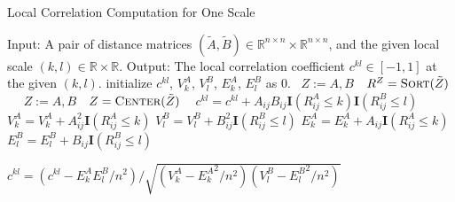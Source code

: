 \documentclass[11pt]{article}
\providecommand{\mb}[1]{\boldsymbol{#1}}
\newcommand{\Real}{\mathbb{R}}
\newcommand{\G}{c}
\newcommand{\Linefor}[2]{%
    \State \algorithmicfor\ {#1}\ \algorithmicdo\ {#2} \algorithmicend\ \algorithmicfor%
}
\begin{document}
\begin{algorithm}
\caption{Local Correlation Computation for One Scale}
\label{alg:1scale}
\begin{algorithmic}[1]
\Statex Input: A pair of distance matrices $(\tilde{A},\tilde{B}) \in \Real^{n \times n} \times \Real^{n \times n}$, and the given local scale $(k,l) \in \Real \times \Real$.
\Statex Output: The local correlation coefficient $\G^{kl} \in [-1,1]$ at the given $(k,l)$.
\State initialize $\G^{kl}$, $V^{A}_{k}$, $V^{B}_{l}$, $E^{A}_{k}$, $E^{B}_{l}$ as $0$.
\Linefor{$Z:=A,B$}{$R^{Z}=\textsc{Sort}(\tilde{Z})$} 
\Linefor{$Z:=A,B$}{$Z=\textsc{Center}(\tilde{Z})$} 
\State $\G^{kl}=\G^{kl}+A_{ij}B_{ij}\mb{I}(R^{A}_{ij} \leq k)\mb{I}(R^{B}_{ij} \leq l)$ 
\State $V^{A}_{k}=V^{A}_{k}+A_{ij}^2\mb{I}(R^{A}_{ij} \leq k)$ 
\State $V^{B}_{l}=V^{B}_{l}+B_{ij}^2\mb{I}(R^{B}_{ij} \leq l)$ 
\State $E^{A}_{k}=E^{A}_{k}+A_{ij}\mb{I}(R^{A}_{ij} \leq k)$ 
\State $E^{B}_{l}=E^{B}_{l}+B_{ij}\mb{I}(R^{B}_{ij} \leq l)$
\EndFor

\State $\G^{kl}=\left(\G^{kl}-E^{A}_{k}E^{B}_{l}/n^2\right)/\sqrt{\left(V^{A}_{k}-{E^{A}_{k}}^2/n^2\right) \left(V^{B}_{l}-{E^{B}_{l}}^2/n^2\right)}$ 

\EndFunction
\end{algorithmic}
\end{algorithm}
\end{document}
